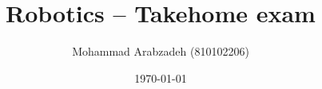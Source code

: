 \documentclass{article}
\begin{document}

\newenvironment{problem}[1]
{
    \textbf{#1}\hrulefill
    \begin{quote}
        }
        {
    \end{quote}
}

\title{Robotics -- Takehome exam}
\author{Mohammad Arabzadeh (810102206)}
\date{\today}

\maketitle

\newenvironment{sect}{\section*}{\par}
\end{document}
